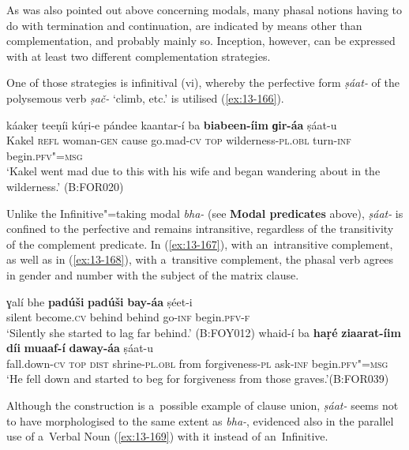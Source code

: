  As was also pointed out above concerning modals, many phasal notions having to do with termination and continuation, are indicated by means other than complementation, and probably mainly so. Inception, however, can be expressed with at least two different complementation strategies.


One of those strategies is infinitival (vi), whereby the perfective form \textit{ṣáat-} of the polysemous verb \textit{ṣač-} `climb, etc.' is utilised (\ref{ex:13-166}). 

\ea\label{ex:13-166}
\gll káakeṛ teeṇíi kúṛi-e pándee kaantar-í ba  \textbf{biabeen-íim} \textbf{ɡir-áa} ṣáat-u \\
Kakel \textsc{ refl} woman-\textsc{gen} cause go.mad-\textsc{cv} \textsc{top} wilderness-\textsc{pl.obl} turn-\textsc{inf} begin.\textsc{pfv"=msg} \\
\glt `Kakel went mad due to this with his wife and began wandering about in the wilderness.' (B:FOR020) 
\z

Unlike the Infinitive"=taking modal \textit{bha-} (see \textbf{Modal predicates} above), \textit{ṣáat-} is confined to the perfective and remains intransitive, regardless of the transitivity of the complement predicate. In (\ref{ex:13-167}), with an~intransitive complement, as well as in (\ref{ex:13-168}), with a~transitive complement, the phasal verb agrees in gender and number with the subject of the matrix clause.

\ea
\label{ex:13-167}
\gll ɣalí bhe \textbf{padúši} \textbf{padúši} \textbf{bay-áa} ṣéet-i  \\
silent become.\textsc{cv} behind behind go-\textsc{inf} begin.\textsc{pfv-f} \\
\glt `Silently she started to lag far behind.' (B:FOY012)
\ex
\label{ex:13-168}
\gll whaid-í ba \textbf{haṛé} \textbf{ziaarat-íim} \textbf{díi} \textbf{muaaf-í} \textbf{daway-áa} ṣáat-u\\
fall.down-\textsc{cv} \textsc{top} \textsc{dist} shrine-\textsc{pl.obl} from forgiveness-\textsc{pl} ask-\textsc{inf} begin.\textsc{pfv"=msg}\\
\glt `He fell down and started to beg for forgiveness from those graves.'\newline (B:FOR039) 
\z

Although the construction is a~possible example of clause union, \textit{ṣáat-} seems not to have morphologised to the same extent as \textit{bha-}, evidenced also in the parallel use of a~Verbal Noun (\ref{ex:13-169}) with it instead of an~Infinitive. 

